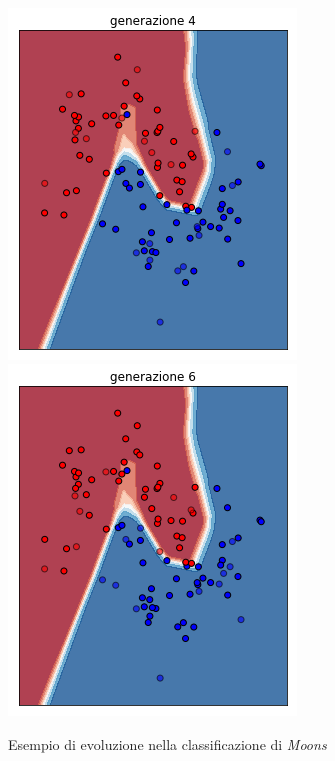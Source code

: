 \documentclass{beamer}
\begin{document}
\begin{frame}
\begin{figure}[H]
 \\
 \includegraphics[scale = 0.25]{images/moons-rnd-log./4.png}
 \includegraphics[scale = 0.25]{images/moons-rnd-log./5.png}
 \caption{\large Esempio di evoluzione nella classificazione di \textit{Moons}}
 \end{figure}
\end{frame}
\end{document}
